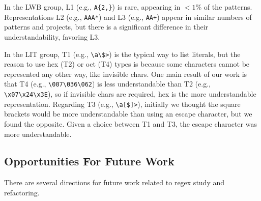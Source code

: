 In the LWB group,  L1 (e.g., \verb!A{2,}!) is rare, appearing in $<1$\% of the patterns. Representations L2 (e.g., \verb!AAA*!) and L3 (e.g., \verb!AA+!) appear in similar numbers of patterns and projects, but there is a significant difference in their understandability, favoring L3.


In the LIT group, T1 (e.g., \verb!\a\$>!) is the typical way to list literals, but the reason to use hex (T2) or oct (T4) types is because some characters cannot be represented any other way, like invisible chars.  One main result of our work is that  T4 (e.g., \verb!\007\036\062!) is  less understandable   than T2 (e.g., \verb!\x07\x24\x3E!), so if invisible chars are required, hex is the more understandable representation.
Regarding T3 (e.g., \verb!\a[$]>!), initially we thought the square brackets would be more understandable than using an escape character,  but we found the opposite. Given a choice between T1 and T3, the escape character was more understandable.

\subsection{Opportunities For Future Work}
There are several directions for future work related to regex study and refactoring.

